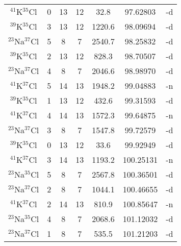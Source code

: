 \begin{table*}[htp]
\begin{tabular}{ccccccc}
$^{41}$K$^{35}$Cl & 0 & 13 & 12 & 32.8 & 97.62803 & -d \\
$^{39}$K$^{35}$Cl & 3 & 13 & 12 & 1220.6 & 98.09694 & -d \\
$^{23}$Na$^{37}$Cl & 5 & 8 & 7 & 2540.7 & 98.25832 & -d \\
$^{39}$K$^{35}$Cl & 2 & 13 & 12 & 828.3 & 98.70507 & -d \\
$^{23}$Na$^{37}$Cl & 4 & 8 & 7 & 2046.6 & 98.98970 & -d \\
$^{41}$K$^{37}$Cl & 5 & 14 & 13 & 1948.2 & 99.04883 & -n \\
$^{39}$K$^{35}$Cl & 1 & 13 & 12 & 432.6 & 99.31593 & -d \\
$^{41}$K$^{37}$Cl & 4 & 14 & 13 & 1572.3 & 99.64875 & -n \\
$^{23}$Na$^{37}$Cl & 3 & 8 & 7 & 1547.8 & 99.72579 & -d \\
$^{39}$K$^{35}$Cl & 0 & 13 & 12 & 33.6 & 99.92949 & -d \\
$^{41}$K$^{37}$Cl & 3 & 14 & 13 & 1193.2 & 100.25131 & -n \\
$^{23}$Na$^{35}$Cl & 5 & 8 & 7 & 2567.8 & 100.36501 & -d \\
$^{23}$Na$^{37}$Cl & 2 & 8 & 7 & 1044.1 & 100.46655 & -d \\
$^{41}$K$^{37}$Cl & 2 & 14 & 13 & 810.9 & 100.85647 & -n \\
$^{23}$Na$^{35}$Cl & 4 & 8 & 7 & 2068.6 & 101.12032 & -d \\
$^{23}$Na$^{37}$Cl & 1 & 8 & 7 & 535.5 & 101.21203 & -d \\
\hline
\end{tabular}

\par 
\end{table*}
